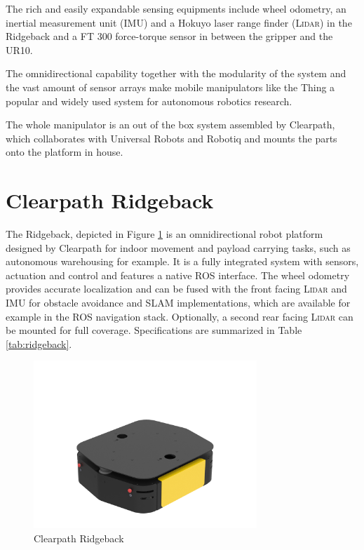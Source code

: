 The rich and easily expandable sensing equipments include wheel odometry, an inertial measurement unit (IMU) and a Hokuyo laser range finder (\textsc{Lidar}) \citep{hokuyo} in the Ridgeback and a FT 300 force-torque sensor \citep{robotiqFT300} in between the gripper and the UR10.

The omnidirectional capability together with the modularity of the system and the vast amount of sensor arrays make mobile manipulators like the Thing a popular and widely used system for autonomous robotics research.

The whole manipulator is an out of the box system assembled by Clearpath, which collaborates with Universal Robots and Robotiq and mounts the parts onto the platform in house.

\section{Clearpath Ridgeback}
	\label{sec:ridgeback}
The Ridgeback, depicted in Figure \ref{pics:ridgeback} is an omnidirectional robot platform designed by Clearpath for indoor movement and payload carrying tasks, such as autonomous warehousing for example. It is a fully integrated system with sensors, actuation and control and features a native ROS interface. The wheel odometry provides accurate localization and can be fused with the front facing \textsc{Lidar} and IMU for obstacle avoidance and SLAM implementations, which are available for example in the ROS navigation stack. Optionally, a second rear facing \textsc{Lidar} can be mounted for full \unit[360]{\textdegree} coverage. Specifications are summarized in Table \ref{tab:ridgeback}.

\begin{figure}[h]
   \centering
   \includegraphics[width=0.75\textwidth]{images/ridgeback.png}
   \caption{Clearpath Ridgeback}
   \label{pics:ridgeback}
\end{figure}

